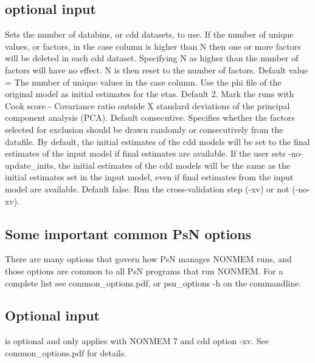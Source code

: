 \subsection {optional input}
\begin{optionlist}
Sets the number of databins, or cdd datasets, to use. If the number of unique values, or factors, in the case column is higher than N then one or more factors will be deleted in each cdd dataset. Specifying N as higher than the number of factors will have no effect. N is then reset to the number of factors. Default value = The number of unique values in the case column. 
\nextopt
{}
Use the phi file of the original model as initial estimates for the etas.
\nextopt
{}
Default 2. Mark the runs with Cook score - Covariance ratio outside X standard deviations of the principal component analysis (PCA). 
\nextopt
{}
Default consecutive. Specifies whether the factors selected for exclusion should be drawn randomly or consecutively from the datafile. 
\nextopt
{}
By default, the initial estimates of the cdd models will be set to the final estimates of the input model if final
estimates are available. If the user sets -no-update\_inits, the initial estimates of the cdd models will be
the same as the initial estimates set in the input model, even if final estimates from the input model are available.
\nextopt
{}
Default false. Run the cross-validation step (-xv) or not (-no-xv). 
\nextopt
\end{optionlist}
			
		\subsection{Some important common PsN options}
		There are many options that govern how PsN manages NONMEM runs, and
		those options are common to all PsN programs that run NONMEM.
		For a complete list see common\_options.pdf, 
		or psn\_options -h on the commandline.
		\subsection{Optional input}
		
		\begin{optionlist}
		is optional and only applies with NONMEM 7 and cdd option -xv. 
		See common\_options.pdf for details.
		\nextopt
		\end{optionlist}

